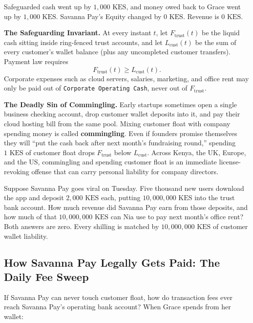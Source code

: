 Safeguarded cash went up by $1{,}000\text{ KES}$, and money owed back to Grace went up by $1{,}000\text{ KES}$. Savanna Pay's Equity changed by $0\text{ KES}$. Revenue is $0\text{ KES}$.

\begin{formalbox}
\textbf{The Safeguarding Invariant.} At every instant $t$, let $F_{\text{trust}}(t)$ be the liquid cash sitting inside ring-fenced trust accounts, and let $L_{\text{cust}}(t)$ be the sum of every customer's wallet balance (plus any uncompleted customer transfers). Payment law requires
\[
  F_{\text{trust}}(t) \ge L_{\text{cust}}(t).
\]
Corporate expenses such as cloud servers, salaries, marketing, and office rent may only be paid out of \texttt{Corporate Operating Cash}, never out of $F_{\text{trust}}$.
\end{formalbox}

\begin{trapbox}
\textbf{The Deadly Sin of Commingling.} Early startups sometimes open a single business checking account, drop customer wallet deposits into it, and pay their cloud hosting bill from the same pool. Mixing customer float with company spending money is called \textbf{commingling}. Even if founders promise themselves they will ``put the cash back after next month's fundraising round,'' spending $1\text{ KES}$ of customer float drops $F_{\text{trust}}$ below $L_{\text{cust}}$. Across Kenya, the UK, Europe, and the US, commingling and spending customer float is an immediate license-revoking offense that can carry personal liability for company directors.
\end{trapbox}

\begin{recoverybox}
Suppose Savanna Pay goes viral on Tuesday. Five thousand new users download the app and deposit $2{,}000\text{ KES}$ each, putting $10{,}000{,}000\text{ KES}$ into the trust bank account. How much revenue did Savanna Pay earn from those deposits, and how much of that $10{,}000{,}000\text{ KES}$ can Nia use to pay next month's office rent? Both answers are zero. Every shilling is matched by $10{,}000{,}000\text{ KES}$ of customer wallet liability.
\end{recoverybox}

\subsection{How Savanna Pay Legally Gets Paid: The Daily Fee Sweep}

If Savanna Pay can never touch customer float, how do transaction fees ever reach Savanna Pay's operating bank account? When Grace spends from her wallet:


